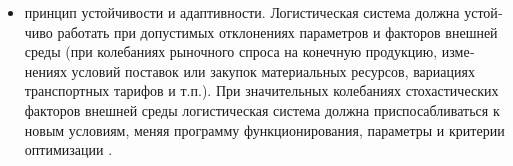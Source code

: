 \begin{itemize}
	\item принцип устойчивости и адаптивности.
	Логистическая система должна устой­чиво работать при допустимых отклоне­ниях параметров и факторов внешней среды (при колебаниях рыночного спроса на конечную продукцию, изме­нениях условий поставок или закупок материальных ресурсов, вариациях транспортных тарифов и т.п.).
	При зна­чительных колебаниях стохастических факторов внешней среды логистическая система должна приспосабливаться к	новым условиям, меняя программу функционирования, параметры и кри­терии оптимизации \cite[с. 19]{sergeev}.
\end{itemize}





